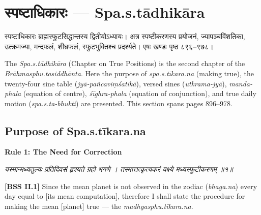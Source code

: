\documentclass[11pt,a4paper]{book}
\newcommand{\dev}[1]{{\devanagarifont #1}}
\newcommand{\bilingual}[2]{%
  \par\vspace{0.6em}%
  \noindent\begin{minipage}[t]{0.48\textwidth}
    \RaggedRight
    #1%
  \end{minipage}%
  \hfill
  \begin{minipage}[t]{0.48\textwidth}
    \RaggedRight
    #2%
  \end{minipage}%
  \par\vspace{0.6em}%
}
\newcommand{\shlokabilingual}[2]{%
  \par\vspace{0.8em}%
  \noindent\begin{minipage}[t]{0.48\textwidth}
    \RaggedRight
    \dev{\textit{#1}}
  \end{minipage}%
  \hfill
  \begin{minipage}[t]{0.48\textwidth}
    \RaggedRight
    #2%
  \end{minipage}%
  \par\vspace{0.8em}%
}
\newcommand{\ruleheadingbilingual}[2]{%
  \par\vspace{0.8em}%
  \noindent\begin{minipage}[t]{0.48\textwidth}
    \textbf{\color{sectioncolor}\dev{#1}}
  \end{minipage}%
  \hfill
  \begin{minipage}[t]{0.48\textwidth}
    \textbf{\color{sectioncolor}#2}
  \end{minipage}%
  \par\vspace{0.4em}%
}
\begin{document}
\clearpage

\chapter[Spa.s.tādhikāra]{\dev{स्पष्टाधिकारः} --- Spa.s.tādhikāra}
\label{chap:spashta}


\bilingual{%
\dev{स्पष्टाधिकारः} ब्राह्मस्फुटसिद्धान्तस्य द्वितीयोऽध्यायः। अत्र स्पष्टीकरणस्य प्रयोजनं, ज्यापञ्चविंशतिका, उत्क्रमज्या, मन्दफलं, शीघ्रफलं, स्फुटभुक्तिश्च प्रदर्श्यते। एषः खण्डः पृष्ठ ८९६--९७८।
}{%
The \textit{Spa.s.tādhikāra} (Chapter on True Positions) is the second chapter of the \textit{Brāhmasphu.tasiddhānta}. Here the purpose of \textit{spa.s.tīkara.na} (making true), the twenty-four sine table (\textit{jyā-pañcaviṃśatikā}), versed sines (\textit{utkrama-jyā}), \textit{manda-phala} (equation of centre), \textit{śīghra-phala} (equation of conjunction), and true daily motion (\textit{spa.s.ta-bhukti}) are presented. This section spans pages 896--978.
}

\section{Purpose of Spa.s.tīkara.na}

\ruleheadingbilingual{नियमः १}{Rule 1: The Need for Correction}

\shlokabilingual{%
यस्मान्मध्यतुल्यः प्रतिदिवसं हृश्यते ग्रहो भगणे ।
तस्मात्तत्कृत्यकरं वक्ष्ये मध्यस्फुटीकरणम्‌ ॥१॥
}{%
\textbf{[BSS II.1]} Since the mean planet is not observed in the zodiac (\textit{bhaga.na}) every day equal to [its mean computation], therefore I shall state the procedure for making the mean [planet] true --- the \textit{madhyasphu.tīkara.na}.
}
\end{document}
